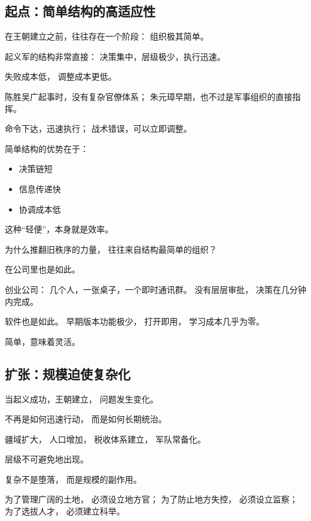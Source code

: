 \documentclass[../main.tex]{subfiles}
\begin{document}
\subsection{起点：简单结构的高适应性}

在王朝建立之前，往往存在一个阶段：
组织极其简单。

起义军的结构非常直接：
决策集中，层级极少，执行迅速。

失败成本低，
调整成本更低。

\begin{examplebox}
	陈胜吴广起事时，没有复杂官僚体系；
	朱元璋早期，也不过是军事组织的直接指挥。
	
	命令下达，迅速执行；
	战术错误，可以立即调整。
\end{examplebox}

简单结构的优势在于：
\begin{itemize}
	\item 决策链短
	\item 信息传递快
	\item 协调成本低
\end{itemize}

这种“轻便”，本身就是效率。

\begin{questionbox}
	为什么推翻旧秩序的力量，
	往往来自结构最简单的组织？
\end{questionbox}

在公司里也是如此。

创业公司：
几个人，一张桌子，一个即时通讯群。
没有层层审批，
决策在几分钟内完成。

软件也是如此。
早期版本功能极少，
打开即用，
学习成本几乎为零。

简单，意味着灵活。

\subsection{扩张：规模迫使复杂化}

当起义成功，王朝建立，
问题发生变化。

不再是如何迅速行动，
而是如何长期统治。

疆域扩大，
人口增加，
税收体系建立，
军队常备化。

层级不可避免地出现。

\begin{readingnote}
	复杂不是堕落，
	而是规模的副作用。
\end{readingnote}

为了管理广阔的土地，
必须设立地方官；
为了防止地方失控，
必须设立监察；
为了选拔人才，
必须建立科举。
\end{document}
